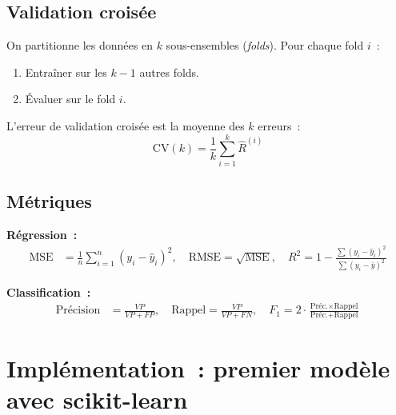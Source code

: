 \subsection{Validation crois\'ee}

\begin{definition}
On partitionne les donn\'ees en $k$ sous-ensembles (\emph{folds}).
Pour chaque fold $i$~:
\begin{enumerate}
  \item Entra\^iner sur les $k-1$ autres folds.
  \item \'Evaluer sur le fold $i$.
\end{enumerate}
L'erreur de validation crois\'ee est la moyenne des $k$ erreurs~:
\begin{equation}
  \text{CV}(k) = \frac{1}{k} \sum_{i=1}^k \hat{R}^{(i)}
\end{equation}
\end{definition}

\subsection{M\'etriques}

\begin{formules}[title=\textbf{M\'etriques courantes}]
\textbf{R\'egression~:}
\begin{align}
  \text{MSE} &= \frac{1}{n}\sum_{i=1}^n (y_i - \hat{y}_i)^2, \quad
  \text{RMSE} = \sqrt{\text{MSE}}, \quad
  R^2 = 1 - \frac{\sum(y_i-\hat{y}_i)^2}{\sum(y_i - \bar{y})^2}
\end{align}

\textbf{Classification~:}
\begin{align}
  \text{Pr\'ecision} &= \frac{VP}{VP + FP}, \quad
  \text{Rappel} = \frac{VP}{VP + FN}, \quad
  F_1 = 2 \cdot \frac{\text{Pr\'ec.} \times \text{Rappel}}{\text{Pr\'ec.} + \text{Rappel}}
\end{align}
\end{formules}

\section{Impl\'ementation~: premier mod\`ele avec scikit-learn}
\label{sec:first-model}

